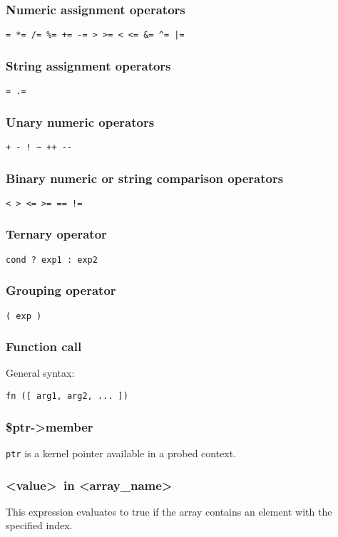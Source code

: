 \documentclass[twoside,english]{article}
\begin{document}
\subsubsection{Numeric assignment operators}
\texttt{= {*}= /= \%= += -= >\,{}>= <\,{}<=
\&= \textasciicircum{}= |=}


\subsubsection{String assignment operators}

\texttt{= .=}


\subsubsection{Unary numeric operators}
\texttt{+ - ! \textasciitilde{} ++ -{}-}


\subsubsection{Binary numeric or string comparison operators}
\texttt{< > <= >= == !=}


\subsubsection{Ternary operator\label{sub:Ternary-operator}}
\texttt{cond ? exp1 : exp2}


\subsubsection{Grouping operator}
\texttt{( exp )}


\subsubsection{Function call}
General syntax:

\texttt{fn ({[} arg1, arg2, ... ])}


\subsubsection{\$ptr-\textgreater member}
\texttt{ptr} is a kernel pointer available in a probed context.


\subsubsection{\textless value\textgreater\ in \textless array\_name\textgreater}
This expression evaluates to true if the array contains an element with the
specified index.
\end{document}
